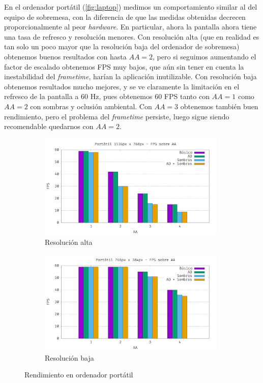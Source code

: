 En el ordenador portátil (\autoref{fig:laptop}) medimos un comportamiento similar al del equipo de sobremesa, con la diferencia de que las medidas obtenidas decrecen proporcionalmente al peor \textit{hardware}. En particular, ahora la pantalla ahora tiene una tasa de refresco y resolución menores. Con resolución alta (que en realidad es tan solo un poco mayor que la resolución baja del ordenador de sobremesa) obtenemos buenos resultados con hasta $AA=2$, pero si seguimos aumentando el factor de escalado obtenemos FPS muy bajos, que aún sin tener en cuenta la inestabilidad del \textit{frametime}, harían la aplicación inutilizable. Con resolución baja obtenemos resultados mucho mejores, y se ve claramente la limitación en el refresco de la pantalla a 60 Hz, pues obtenemos 60 FPS tanto con $AA=1$ como $AA=2$ con sombras y oclusión ambiental. Con $AA=3$ obtenemos también buen rendimiento, pero el problema del \textit{frametime} persiste, luego sigue siendo recomendable quedarnos con $AA=2$.\newline
\begin{figure}[!ht]
     \begin{subfigure}[c]{\linewidth}
        \centering
        \includegraphics[width=0.98\textwidth]{Plantilla-TFG-master/img/graficas/LaptopHR.png}
        \caption{Resolución alta}
     \end{subfigure}
     \begin{subfigure}[c]{\linewidth}
        \centering
        \includegraphics[width=0.98\textwidth]{Plantilla-TFG-master/img/graficas/LaptopLR.png}
        \caption{Resolución baja}
     \end{subfigure}
     \caption{Rendimiento en ordenador portátil}
     \label{fig:laptop}
\end{figure}

